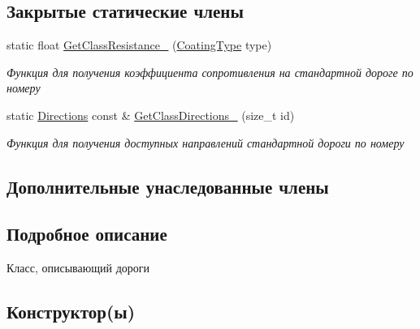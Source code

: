 \subsection*{Закрытые статические члены}
\begin{DoxyCompactItemize}
\item 
static float \hyperlink{classrtm_1_1_road_coating_ac5bb86996945090417532dd5af056a24}{Get\+Class\+Resistance\+\_\+} (\hyperlink{namespacertm_aecd3929e64cd461eb3555b611f6fad95}{Coating\+Type} type)
\begin{DoxyCompactList}\small\item\em Функция для получения коэффициента сопротивления на стандартной дороге по номеру \end{DoxyCompactList}\item 
static \hyperlink{namespacertm_a4776fbfe59834ff1a16838ad6735b69a}{Directions} const  \& \hyperlink{classrtm_1_1_road_coating_ae95e308d1f3998967ca420fa83f2bd93}{Get\+Class\+Directions\+\_\+} (size\+\_\+t id)
\begin{DoxyCompactList}\small\item\em Функция для получения доступных направлений стандартной дороги по номеру \end{DoxyCompactList}\end{DoxyCompactItemize}
\subsection*{Дополнительные унаследованные члены}


\subsection{Подробное описание}
Класс, описывающий дороги 

\subsection{Конструктор(ы)}
\mbox{\label{classrtm_1_1_road_coating_a3daed8c05e6901a8e2aedd5bd8b10e88}} 
